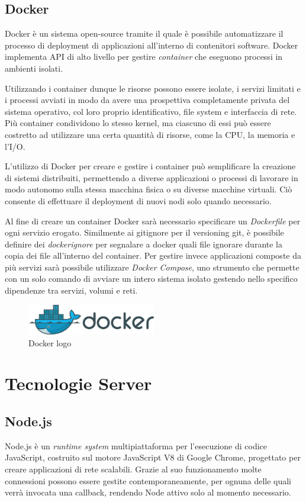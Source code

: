 \subsection{Docker}
Docker è un sistema open-source tramite il quale è possibile automatizzare il processo di deployment di applicazioni all'interno di contenitori software.
Docker implementa API di alto livello per gestire \emph{container} che eseguono processi in ambienti isolati.

Utilizzando i container dunque le risorse possono essere isolate, i servizi limitati e i processi avviati in modo da avere una prospettiva completamente privata del sistema operativo, col loro proprio identificativo, file system e interfaccia di rete. Più container condividono lo stesso kernel, ma ciascuno di essi può essere costretto ad utilizzare una certa quantità di risorse, come la CPU, la memoria e l'I/O.

L'utilizzo di Docker per creare e gestire i container può semplificare la creazione di sistemi distribuiti, permettendo a diverse applicazioni o processi di lavorare in modo autonomo sulla stessa macchina fisica o su diverse macchine virtuali. Ciò consente di effettuare il deployment di nuovi nodi solo quando necessario.

Al fine di creare un container Docker sarà necessario specificare un \emph{Dockerfile} per ogni servizio erogato. 
Similmente ai gitignore per il versioning git, è possibile definire dei \emph{dockerignore} per segnalare a docker quali file ignorare durante la copia dei file all'interno del container. Per gestire invece applicazioni composte da più servizi sarà possibile utilizzare \emph{Docker Compose}, uno strumento che permette con un solo comando di avviare un intero sistema isolato gestendo nello specifico dipendenze tra servizi, volumi e reti.

\begin{figure}[H]
\centering
\includegraphics[width=0.5\textwidth]{img/logos/docker_logo.png}
\caption{Docker logo}
\label{fig:docker}
\end{figure}

\section{Tecnologie Server}
\subsection{Node.js}
Node.js \cite{nodejsWikipedia} è un \emph{runtime system} multipiattaforma per l'esecuzione di codice JavaScript, costruito sul motore JavaScript V8 di Google Chrome, progettato per creare applicazioni di rete scalabili. Grazie al suo funzionamento molte connessioni possono essere gestite contemporaneamente, per ognuna delle quali verrà invocata una callback, rendendo Node attivo solo al momento necessario.\\

